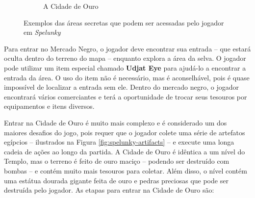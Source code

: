 \begin{figure}[htb!]
\begin{subfigure}[b]{0.4\textwidth}
		\caption{A Cidade de Ouro}
		\label{fig:spelunky-cityofgold}
	\end{subfigure}
	\caption{Exemplos das áreas secretas que podem ser acessadas pelo jogador em
	\textit{Spelunky}}
	\label{fig:spelunky-secret-areas}
\end{figure}


Para entrar no Mercado Negro, o jogador deve encontrar sua entrada -- que estará
oculta dentro do terreno do mapa -- enquanto explora a área da selva. O jogador
pode utilizar um item especial chamado \textbf{Udjat Eye} para ajudá-lo a
encontrar a entrada da área. O uso do item não é necessário, mas é aconselhável,
pois é quase impossível de localizar a entrada sem ele. Dentro do mercado negro,
o jogador encontrará vários comerciantes e terá a oportunidade de trocar seus
tesouros por equipamentos e itens diversos.

Entrar na Cidade de Ouro é muito mais complexo e é considerado um dos maiores
desafios do jogo, pois requer que o jogador colete uma série de artefatos
egípcios -- ilustrados na Figura \ref{fig:spelunky-artifacts} -- e execute uma
longa cadeia de ações ao longo da partida. A Cidade de Ouro é idêntica a um
nível do Templo, mas o terreno é feito de ouro maciço -- podendo ser destruído
com bombas -- e contém muito mais tesouros para coletar.  Além disso, o nível
contém uma estátua dourada gigante feita de ouro e pedras preciosas que pode ser
destruída pelo jogador. As etapas para entrar na Cidade de Ouro são:

